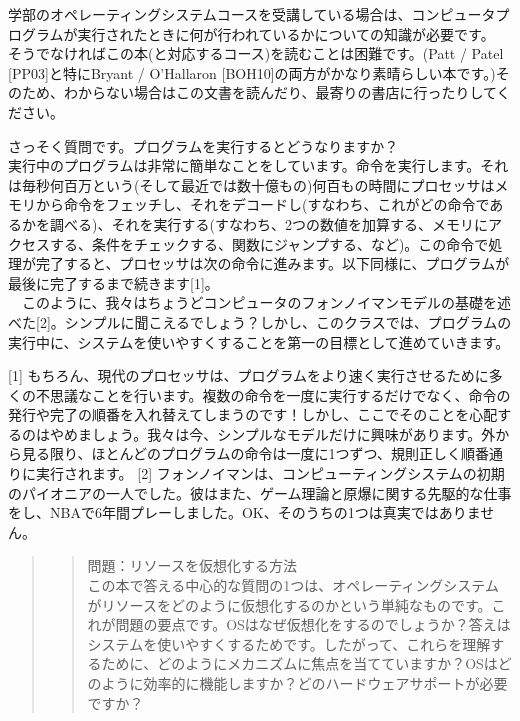 学部のオペレーティングシステムコースを受講している場合は、コンピュータプログラムが実行されたときに何が行われているかについての知識が必要です。
そうでなければこの本(と対応するコース)を読むことは困難です。(Patt /
Patel {[}PP03{]}と特にBryant / O'Hallaron
{[}BOH10{]}の両方がかなり素晴らしい本です。)そのため、わからない場合はこの文書を読んだり、最寄りの書店に行ったりしてください。

さっそく質問です。プログラムを実行するとどうなりますか？\\
実行中のプログラムは非常に簡単なことをしています。命令を実行します。それは毎秒何百万という(そして最近では数十億もの)何百もの時間にプロセッサはメモリから命令をフェッチし、それをデコードし(すなわち、これがどの命令であるかを調べる)、それを実行する(すなわち、2つの数値を加算する、メモリにアクセスする、条件をチェックする、関数にジャンプする、など)。この命令で処理が完了すると、プロセッサは次の命令に進みます。以下同様に、プログラムが最後に完了するまで続きます{[}1{]}。\\
　このように、我々はちょうどコンピュータのフォンノイマンモデルの基礎を述べた{[}2{]}。シンプルに聞こえるでしょう？しかし、このクラスでは、プログラムの実行中に、システムを使いやすくすることを第一の目標として進めていきます。

{[}1{]}
もちろん、現代のプロセッサは、プログラムをより速く実行させるために多くの不思議なことを行います。複数の命令を一度に実行するだけでなく、命令の発行や完了の順番を入れ替えてしまうのです！しかし、ここでそのことを心配するのはやめましょう。我々は今、シンプルなモデルだけに興味があります。外から見る限り、ほとんどのプログラムの命令は一度に1つずつ、規則正しく順番通りに実行されます。
{[}2{]}
フォンノイマンは、コンピューティングシステムの初期のパイオニアの一人でした。彼はまた、ゲーム理論と原爆に関する先駆的な仕事をし、NBAで6年間プレーしました。OK、そのうちの1つは真実ではありません。

\begin{quote}
\begin{quote}
問題：リソースを仮想化する方法\\
この本で答える中心的な質問の1つは、オペレーティングシステムがリソースをどのように仮想化するのかという単純なものです。これが問題の要点です。OSはなぜ仮想化をするのでしょうか？答えはシステムを使いやすくするためです。したがって、これらを理解するために、どのようにメカニズムに焦点を当てていますか？OSはどのように効率的に機能しますか？どのハードウェアサポートが必要ですか？
\end{quote}
\end{quote}

